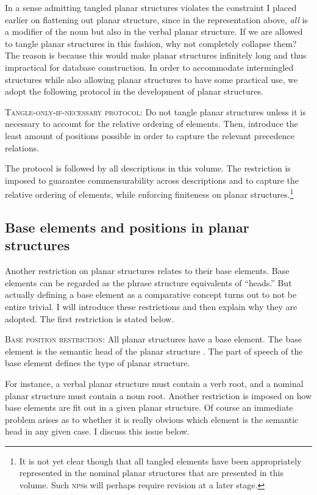 \documentclass[output=paper,hidelinks]{langscibook}
\begin{document}
In a sense admitting tangled planar structures violates the constraint I placed earlier on flattening out planar structure, since in the representation above, \textit{all} is a modifier of the noun but also in the verbal planar structure. If we are allowed to tangle planar structures in this fashion, why not completely collapse them? The reason is because this would make planar structures infinitely long and thus impractical for database construction. In order to accommodate intermingled structures while also allowing planar structures to have some practical use, we adopt the following protocol in the development of planar structures.

\ea 
    \textsc{Tangle-only-if-necessary protocol}: Do not tangle planar structures unless it is necessary to account for the relative ordering of elements. Then, introduce the least amount of positions possible in order to capture the relevant precedence relations.
\z 

The protocol is followed by all descriptions in this volume. The restriction is imposed to guarantee commensurability across descriptions and to capture the relative ordering of elements, while enforcing finiteness on planar structures.\footnote{It is not yet clear though that all tangled elements have been appropriately represented in the nominal planar structures that are presented in this volume. Such \textsc{nps}s will perhaps require revision at a later stage.}

\subsection{Base elements and positions in planar structures}
\label{sec:baseelements}

Another restriction on planar structures relates to their base elements. Base elements can be regarded as the phrase structure equivalents of ``heads.'' But actually defining a base element as a comparative concept turns out to not be entire trivial. I will introduce these restrictions and then explain why they are adopted. The first restriction is stated below.

\ea 
    \textsc{Base position restriction}: All planar structures have a base element. The base element is the semantic head of the planar structure \citep{croft_radical_2001, croft2022cambridge}. The part of speech of the base element defines the type of planar structure. 
\z 

For instance, a verbal planar structure must contain a verb root, and a nominal planar structure must contain a noun root. Another restriction is imposed on how base elements are fit out in a given planar structure. Of course an immediate problem arises as to whether it is really obvious which element is the semantic head in any given case. I discuss this issue below. 
\end{document}
